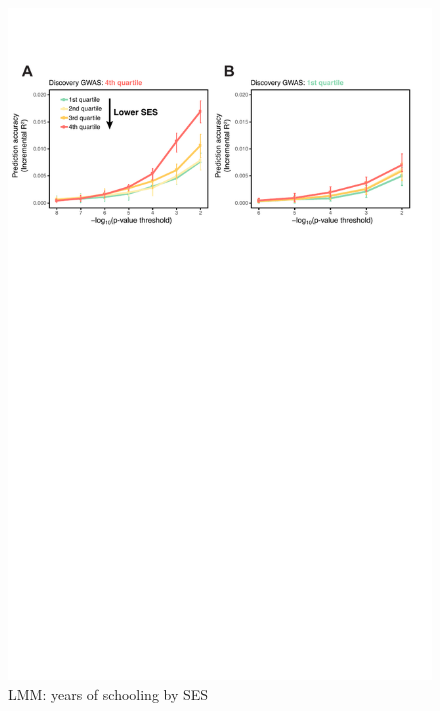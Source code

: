 \documentclass[hidelinks, 12pt]{article}
\begin{document}
\begin{figure}[h!]
\includegraphics[width=\textwidth]{./supp_figures/bolt_eduyears.pdf}
\caption{LMM: years of schooling by SES}
\centering
\end{figure}
\end{document}
